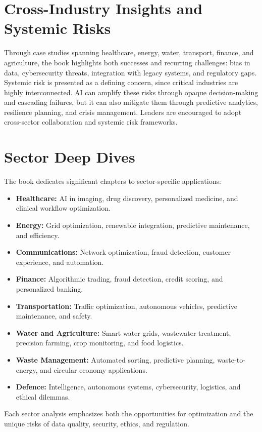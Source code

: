 \section*{Cross-Industry Insights and Systemic Risks}
Through case studies spanning healthcare, energy, water, transport, finance, and agriculture, the book highlights both successes and recurring challenges: 
bias in data, cybersecurity threats, integration with legacy systems, and regulatory gaps. 
Systemic risk is presented as a defining concern, since critical industries are highly interconnected. 
AI can amplify these risks through opaque decision-making and cascading failures, but it can also mitigate them through predictive analytics, 
resilience planning, and crisis management. Leaders are encouraged to adopt cross-sector collaboration and systemic risk frameworks. 

\section*{Sector Deep Dives}
The book dedicates significant chapters to sector-specific applications: 
\begin{itemize}
    \item \textbf{Healthcare:} AI in imaging, drug discovery, personalized medicine, and clinical workflow optimization. 
    \item \textbf{Energy:} Grid optimization, renewable integration, predictive maintenance, and efficiency. 
    \item \textbf{Communications:} Network optimization, fraud detection, customer experience, and automation. 
    \item \textbf{Finance:} Algorithmic trading, fraud detection, credit scoring, and personalized banking. 
    \item \textbf{Transportation:} Traffic optimization, autonomous vehicles, predictive maintenance, and safety. 
    \item \textbf{Water and Agriculture:} Smart water grids, wastewater treatment, precision farming, crop monitoring, and food logistics. 
    \item \textbf{Waste Management:} Automated sorting, predictive planning, waste-to-energy, and circular economy applications. 
    \item \textbf{Defence:} Intelligence, autonomous systems, cybersecurity, logistics, and ethical dilemmas. 
\end{itemize}
Each sector analysis emphasizes both the opportunities for optimization and the unique risks of data quality, security, 
ethics, and regulation. 

